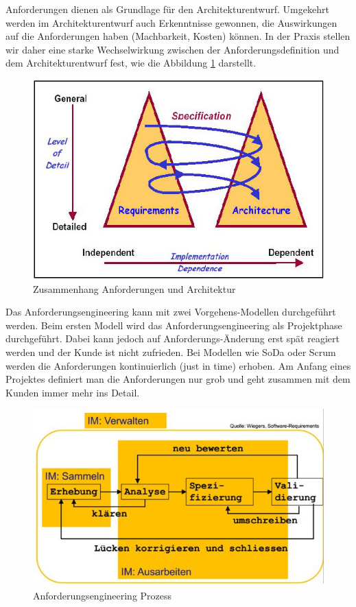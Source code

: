Anforderungen dienen als Grundlage für den Architekturentwurf. Umgekehrt werden im Architekturentwurf auch
Erkenntnisse gewonnen, die Auswirkungen auf die Anforderungen haben (Machbarkeit, Kosten) können. In der Praxis stellen wir daher
eine starke Wechselwirkung zwischen der Anforderungsdefinition und dem Architekturentwurf fest, wie die Abbildung \ref{fig:anforderungsengineering} darstellt.
\begin{figure}[h!]
	\centering
	\includegraphics[width=0.7\linewidth]{fig/anforderungsengineering}
	\caption{Zusammenhang Anforderungen und Architektur}
	\label{fig:anforderungsengineering}
\end{figure}
Das Anforderungsengineering kann mit zwei Vorgehens-Modellen durchgeführt werden. Beim ersten Modell wird das Anforderungsengineering als Projektphase durchgeführt. Dabei kann jedoch auf Anforderungs-Änderung erst spät reagiert werden und der Kunde ist nicht zufrieden. Bei Modellen wie SoDa oder Scrum werden die Anforderungen kontinuierlich (just in time) erhoben. Am Anfang eines Projektes definiert man die Anforderungen nur grob und geht zusammen mit dem Kunden immer mehr ins Detail.

\begin{figure}[h!]
	\centering
	\includegraphics[width=0.7\linewidth]{fig/anforderungsengineering-prozess}
	\caption{Anforderungsengineering Prozess}
	\label{fig:anforderungsengineering-prozess}
\end{figure}

